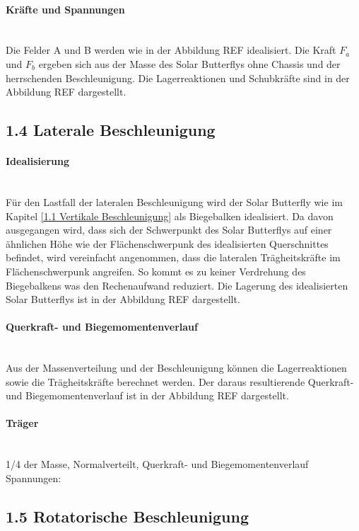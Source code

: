   \paragraph{Kräfte und Spannungen}\mbox{}\\
  Die Felder A und B werden wie in der Abbildung REF idealisiert. Die Kraft $F_a$ und $F_b$ ergeben sich aus der Masse des Solar Butterflys ohne Chassis und der herrschenden Beschleunigung. Die Lagerreaktionen und Schubkräfte sind in der Abbildung REF dargestellt.

\subsection{1.4 Laterale Beschleunigung}
  \paragraph{Idealisierung}\mbox{}\\
  Für den Lastfall der lateralen Beschleunigung wird der Solar Butterfly wie im Kapitel \ref{1.1 Vertikale Beschleunigung} als Biegebalken idealisiert. Da davon ausgegangen wird, dass sich der Schwerpunkt des Solar Butterflys auf einer ähnlichen Höhe wie der Flächenschwerpunk des idealisierten Querschnittes befindet, wird vereinfacht angenommen, dass die lateralen Trägheitskräfte im Flächenschwerpunk angreifen. So kommt es zu keiner Verdrehung des Biegebalkens was den Rechenaufwand reduziert. Die Lagerung des idealisierten Solar Butterflys ist in der Abbildung REF dargestellt.

  \paragraph{Querkraft- und Biegemomentenverlauf}\mbox{}\\
  Aus der Massenverteilung und der Beschleunigung können die Lagerreaktionen sowie die Trägheitskräfte berechnet werden. Der daraus resultierende Querkraft- und Biegemomentenverlauf ist in der Abbildung REF dargestellt.



  \paragraph{Träger}\mbox{}\\
  1/4 der Masse, Normalverteilt, Querkraft- und Biegemomentenverlauf
  Spannungen:

\subsection{1.5 Rotatorische Beschleunigung}












